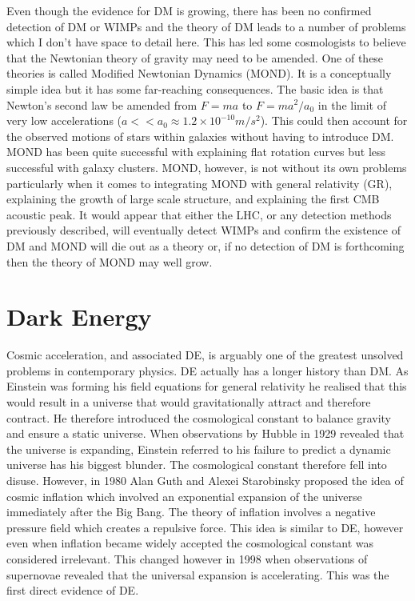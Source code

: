 \documentclass[a4paper,12pt]{article}
\begin{document}
Even though the evidence for DM is growing, there has been no confirmed detection of DM or WIMPs and the theory of DM leads to a number of problems \citep{sellwood} which I don't
have space to detail here. This has led some cosmologists to believe that the Newtonian theory of gravity may need to be amended. One of these theories is called Modified Newtonian
Dynamics (MOND). It is a conceptually simple idea but it has some far-reaching consequences. The basic idea is that Newton's second law be amended from $F=ma$ to $F=ma^2/a_0$ in the
limit of very low accelerations ($a<<a_0\approx 1.2\times10^{-10}m/s^2$). This could then account for the observed motions of stars within galaxies without having to introduce
DM. MOND has been quite successful with explaining flat rotation curves but less successful with galaxy clusters. MOND, however, is not without its own problems particularly when it
comes to integrating MOND with general relativity (GR), explaining the growth of large scale structure, and explaining the first CMB acoustic peak.
It would appear that either the LHC, or any detection methods previously described, will eventually detect WIMPs and confirm the existence of DM and MOND will die out as a theory or, if
no detection of DM is forthcoming then the theory of MOND may well grow.

\section{Dark Energy}
Cosmic acceleration, and associated DE, is arguably one of the greatest unsolved problems in contemporary physics. DE actually has a longer history than DM. As Einstein was forming his 
field equations for general relativity he realised that this would result in a universe that would
gravitationally attract and therefore contract. He therefore introduced the cosmological constant to balance gravity and ensure a static universe. When observations by Hubble in 1929
revealed that the universe is expanding, Einstein referred to his failure to predict a dynamic universe has his biggest blunder. The cosmological constant therefore fell into disuse.
However, in 1980 Alan Guth and Alexei Starobinsky proposed the idea of cosmic inflation which involved an exponential expansion of the universe immediately after the Big Bang. The theory
of inflation involves a negative pressure field which creates a repulsive force. This idea is similar to DE, however even when inflation became widely accepted the 
cosmological constant was considered irrelevant. This changed however in 1998 when observations of supernovae revealed that the universal expansion is accelerating. This was the first
direct evidence of DE.
\end{document}
